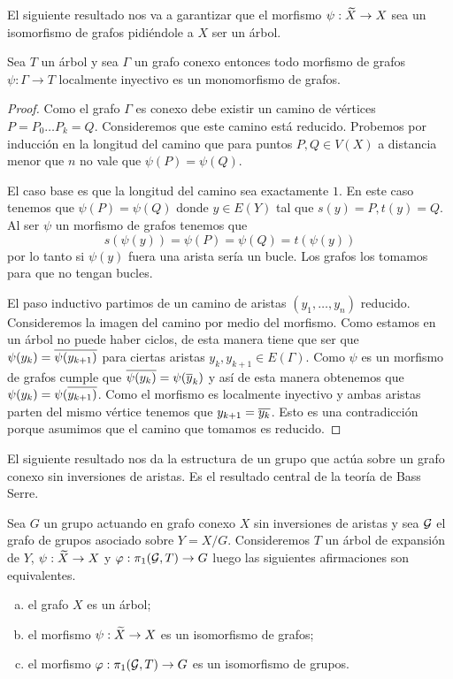 \documentclass[tesis.tex]{subfiles}
\begin{document}
El siguiente resultado nos va a garantizar que el morfismo $\psi: \widetilde X \to X$ sea un isomorfismo de grafos pidiéndole a $X$ ser un árbol.

\begin{prop}\label{prop_loc_iny}
	Sea $T$ un árbol y sea $\Gamma$ un grafo conexo entonces todo morfismo de grafos $\psi:\Gamma \to T$ localmente inyectivo es un monomorfismo de grafos.    
\end{prop}
\begin{proof}
	Como el grafo $\Gamma$ es conexo debe existir un camino de vértices $P=P_0 \dots P_k=Q$.
	Consideremos que este camino está reducido.
	Probemos por inducción en la longitud del camino que para puntos $P,Q \in V(X)$ a distancia menor que $n$ no vale que $\psi(P) = \psi(Q)$.
	
	El caso base es que la longitud del camino sea exactamente $1$.
	En este caso tenemos que $\psi(P) = \psi(Q)$ donde $y \in E(Y)$ tal que $s(y)= P, t(y) = Q$.
	Al ser $\psi$ un morfismo de grafos tenemos que 
	\begin{equation*}
		s(\psi(y)) = \psi(P) = \psi (Q) = t(\psi(y))
	\end{equation*}
	por lo tanto si $\psi(y)$ fuera una arista sería un bucle.
	Los grafos los tomamos para que no tengan bucles.
	
	El paso inductivo partimos de un camino de aristas $(y_1, \dots, y_n)$ reducido.
	Consideremos la imagen del camino por medio del morfismo.
	Como estamos en un árbol no puede haber ciclos, de esta manera tiene que ser que $\psi(y_k) = \overline{\psi (y_{k+1})}$ para ciertas aristas $y_k, y_{k+1} \in E(\Gamma)$.
	Como $\psi$ es un morfismo de grafos cumple que $\overline {\psi(y_k)} = \psi(\overline y_k)$ y así de esta manera obtenemos que $\psi(y_k) =  \psi(\overline{y_{k+1})}$.
	Como el morfismo es localmente inyectivo y ambas aristas parten del mismo vértice tenemos que $y_{k+1} = \overline{y_k}$. Esto es una contradicción porque asumimos que el camino que tomamos es reducido.    
\end{proof}

El siguiente resultado nos da la estructura de un grupo que actúa sobre un grafo conexo sin inversiones de aristas. 
Es el resultado central de la teoría de Bass Serre.

\begin{teo}\label{teo_Serre}
	Sea $G$ un grupo actuando en grafo conexo $X$ sin inversiones de aristas y sea $\cal G$ el grafo de grupos asociado sobre $Y = X / G$.
	Consideremos $T$ un árbol de expansión de $Y$, $\psi: \widetilde X \to X$ y $\varphi: \pi_1({\cal G}, T) \to G$ luego las siguientes afirmaciones son equivalentes.
	\begin{enumerate}[(a)]
		\item el grafo $X$ es un árbol;
		\item el morfismo $\psi: \widetilde X \to X$ es un isomorfismo de grafos;
		\item el morfismo $\varphi:\pi_1({\cal G}, T) \to G$ es un isomorfismo de grupos.
	\end{enumerate}
\end{teo}
\end{document}
